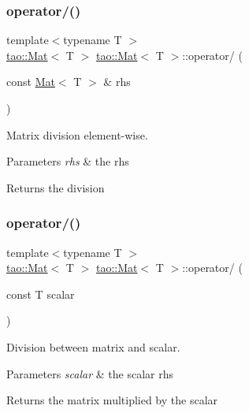 \subsubsection{\texorpdfstring{operator/()}{operator/()}\hspace{0.1cm}{\footnotesize\ttfamily [1/2]}}
{\footnotesize\ttfamily template$<$typename T $>$ \\
\mbox{\hyperlink{classtao_1_1_mat}{tao\+::\+Mat}}$<$ T $>$ \mbox{\hyperlink{classtao_1_1_mat}{tao\+::\+Mat}}$<$ T $>$\+::operator/ (\begin{DoxyParamCaption}\item[{const \mbox{\hyperlink{classtao_1_1_mat}{Mat}}$<$ T $>$ \&}]{rhs }\end{DoxyParamCaption})}



Matrix division element-\/wise. 


\begin{DoxyParams}{Parameters}
{\em rhs} & the rhs \\
\hline
\end{DoxyParams}
\begin{DoxyReturn}{Returns}
the division 
\end{DoxyReturn}
\mbox{\label{classtao_1_1_mat_a3dde01988a0bb663e5fbeae1d509eb0c}} 
\subsubsection{\texorpdfstring{operator/()}{operator/()}\hspace{0.1cm}{\footnotesize\ttfamily [2/2]}}
{\footnotesize\ttfamily template$<$typename T $>$ \\
\mbox{\hyperlink{classtao_1_1_mat}{tao\+::\+Mat}}$<$ T $>$ \mbox{\hyperlink{classtao_1_1_mat}{tao\+::\+Mat}}$<$ T $>$\+::operator/ (\begin{DoxyParamCaption}\item[{const T}]{scalar }\end{DoxyParamCaption})}



Division between matrix and scalar. 


\begin{DoxyParams}{Parameters}
{\em scalar} & the scalar rhs \\
\hline
\end{DoxyParams}
\begin{DoxyReturn}{Returns}
the matrix multiplied by the scalar 
\end{DoxyReturn}
\mbox{\label{classtao_1_1_mat_a032760595aa5055588624aa56758b323}} 
